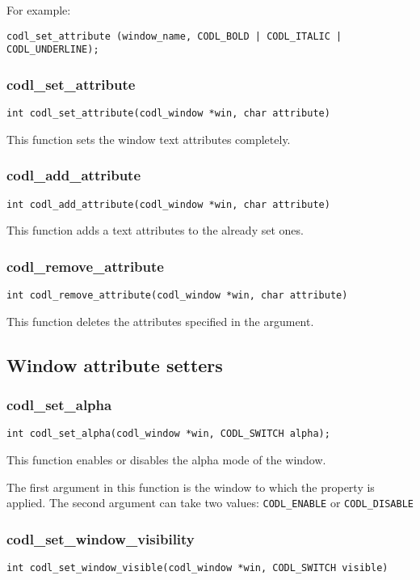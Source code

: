\documentclass{article}
\newcommand{\fstep}{\vspace{3mm}\noindent}
\begin{document}
\noindent\vspace{3mm} For example:

{\tt codl\_set\_attribute (window\_name, CODL\_BOLD | CODL\_ITALIC | CODL\_UNDERLINE);}

\subsubsection{codl\_set\_attribute}
{\tt int codl\_set\_attribute(codl\_window *win, char attribute)}

\fstep{} This function sets the window text attributes completely.

\subsubsection{codl\_add\_attribute}
{\tt int codl\_add\_attribute(codl\_window *win, char attribute)}

\noindent\vspace{3mm} This function adds a text attributes to the already set
ones.

\subsubsection{codl\_remove\_attribute} 
{\tt int codl\_remove\_attribute(codl\_window *win, char attribute)}

\fstep{} This function deletes the attributes specified in the
argument.

\subsection{Window attribute setters}

\subsubsection{codl\_set\_alpha}
{\tt int codl\_set\_alpha(codl\_window *win, CODL\_SWITCH alpha);}

\fstep{} This function enables or disables the alpha mode of the window.

The first argument in this function is the window to which the property is applied.
The second argument can take two values: {\tt CODL\_ENABLE} or {\tt CODL\_DISABLE}

\subsubsection{codl\_set\_window\_visibility}
{\tt int codl\_set\_window\_visible(codl\_window *win, CODL\_SWITCH visible)}
\end{document}
